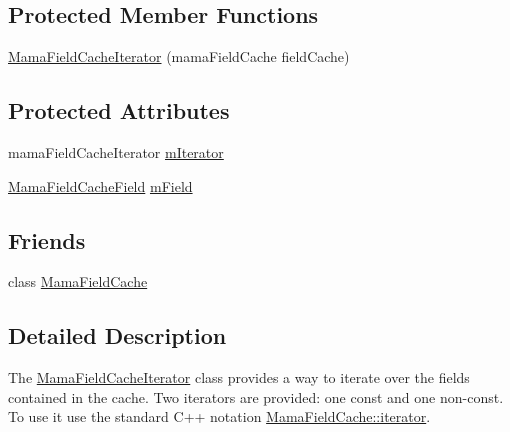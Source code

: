 \subsection*{Protected Member Functions}
\begin{DoxyCompactItemize}
\item 
\hyperlink{classWombat_1_1MamaFieldCache_1_1MamaFieldCacheIterator_a78baad6bc804023c39798741abe8940e}{MamaFieldCacheIterator} (mamaFieldCache fieldCache)
\end{DoxyCompactItemize}
\subsection*{Protected Attributes}
\begin{DoxyCompactItemize}
\item 
mamaFieldCacheIterator \hyperlink{classWombat_1_1MamaFieldCache_1_1MamaFieldCacheIterator_a75827ac60afb7271d94de5abf683231e}{mIterator}
\item 
\hyperlink{classWombat_1_1MamaFieldCacheField}{MamaFieldCacheField} \hyperlink{classWombat_1_1MamaFieldCache_1_1MamaFieldCacheIterator_a4c148281e6266bf04c230fc8a488f0fb}{mField}
\end{DoxyCompactItemize}
\subsection*{Friends}
\begin{DoxyCompactItemize}
\item 
class \hyperlink{classWombat_1_1MamaFieldCache_1_1MamaFieldCacheIterator_a6a1b5aceea64638fc294b40bdb9251fb}{MamaFieldCache}
\end{DoxyCompactItemize}


\subsection{Detailed Description}
The {\ttfamily \hyperlink{classWombat_1_1MamaFieldCache_1_1MamaFieldCacheIterator}{MamaFieldCacheIterator}} class provides a way to iterate over the fields contained in the cache. Two iterators are provided: one const and one non-\/const. To use it use the standard C++ notation {\ttfamily \hyperlink{classWombat_1_1MamaFieldCache_1_1iterator}{MamaFieldCache::iterator}}. 

